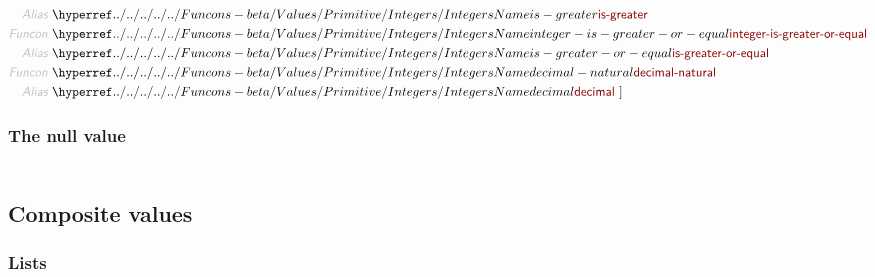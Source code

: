 \begin{align*}
  \KEY{Alias} ~ & \NAMEHYPER{../../../../../Funcons-beta/Values/Primitive}{Integers}{is-greater} \\
  \KEY{Funcon} ~ & \NAMEHYPER{../../../../../Funcons-beta/Values/Primitive}{Integers}{integer-is-greater-or-equal} \\
  \KEY{Alias} ~ & \NAMEHYPER{../../../../../Funcons-beta/Values/Primitive}{Integers}{is-greater-or-equal} \\
  \KEY{Funcon} ~ & \NAMEHYPER{../../../../../Funcons-beta/Values/Primitive}{Integers}{decimal-natural} \\
  \KEY{Alias} ~ & \NAMEHYPER{../../../../../Funcons-beta/Values/Primitive}{Integers}{decimal}
  ~ ]
\end{align*}
\subsubsection*{The null value}\hypertarget{the-null-value}{}\label{the-null-value}

\begin{align*}
  [ ~ 
  \KEY{Datatype} ~ & \NAMEHYPER{../../../../../Funcons-beta/Values/Primitive}{Null}{null-type} \\
  \KEY{Funcon} ~ & \NAMEHYPER{../../../../../Funcons-beta/Values/Primitive}{Null}{null-value} \\
  \KEY{Alias} ~ & \NAMEHYPER{../../../../../Funcons-beta/Values/Primitive}{Null}{null}
  ~ ]
\end{align*}
\subsection*{Composite values}\hypertarget{composite-values}{}\label{composite-values}

\subsubsection*{Lists}\hypertarget{lists}{}\label{lists}

\begin{align*}
  [ ~ 
  \KEY{Datatype} ~ & \NAMEHYPER{../../../../../Funcons-beta/Values/Composite}{Lists}{lists} \\
  \KEY{Funcon} ~ & \NAMEHYPER{../../../../../Funcons-beta/Values/Composite}{Lists}{list-nil} \\
  \KEY{Alias} ~ & \NAMEHYPER{../../../../../Funcons-beta/Values/Composite}{Lists}{nil} \\
  \KEY{Funcon} ~ & \NAMEHYPER{../../../../../Funcons-beta/Values/Composite}{Lists}{list-cons} \\
  \KEY{Alias} ~ & \NAMEHYPER{../../../../../Funcons-beta/Values/Composite}{Lists}{cons} \\
  \KEY{Funcon} ~ & \NAMEHYPER{../../../../../Funcons-beta/Values/Composite}{Lists}{list-head} \\
  \KEY{Alias} ~ & \NAMEHYPER{../../../../../Funcons-beta/Values/Composite}{Lists}{head} \\
  \KEY{Funcon} ~ & \NAMEHYPER{../../../../../Funcons-beta/Values/Composite}{Lists}{list-tail} \\
  \KEY{Alias} ~ & \NAMEHYPER{../../../../../Funcons-beta/Values/Composite}{Lists}{tail}
  ~ ]
\end{align*}
